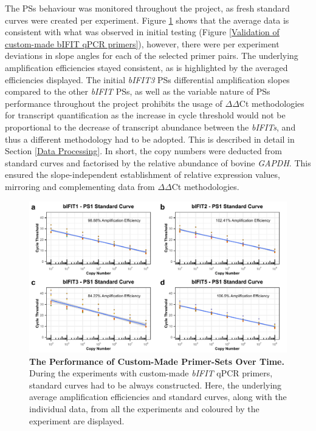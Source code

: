 The PSs behaviour was monitored throughout the project, as fresh standard curves were created per experiment. Figure \ref{The Performance of Custom Made Primer Sets Over Time} shows that the average data is consistent with what was observed in initial testing (Figure \ref{Validation of custom-made bIFIT qPCR primers}), however, there were per experiment deviations in slope angles for each of the selected primer pairs. The underlying amplification efficiencies stayed consistent, as is highlighted by the averaged efficiencies displayed. The initial \textit{bIFIT3} PSs differential amplification slopes compared to the other \textit{bIFIT} PSs, as well as the variable nature of PSs performance throughout the project prohibits the usage of \(\Delta\)\(\Delta\)Ct methodologies for transcript quantification as the increase in cycle threshold would not be proportional to the decrease of transcript abundance between the \textit{bIFITs}, and thus a different methodology had to be adopted. This is described in detail in Section \ref{Data Processing}. In short, the copy numbers were deducted from standard curves and factorised by the relative abundance of bovine \textit{GAPDH}. This ensured the slope-independent establishment of relative expression values, mirroring and complementing data from \(\Delta\)\(\Delta\)Ct methodologies.

\begin{figure}
    \centering
    \includegraphics[width=1\linewidth]{07. Chapter 2/Figs/01. Technologies/03. standard curves behaviour.pdf}
    \caption[The Performance of Custom-Made Primer-Sets Over Time.]{\textbf{The Performance of Custom-Made Primer-Sets Over Time.} During the experiments with custom-made \textit{bIFIT} qPCR primers, standard curves had to be always constructed. Here, the underlying average amplification efficiencies and standard curves, along with the individual data, from all the experiments and coloured by the experiment are displayed.}
    \label{The Performance of Custom Made Primer Sets Over Time}
\end{figure}


